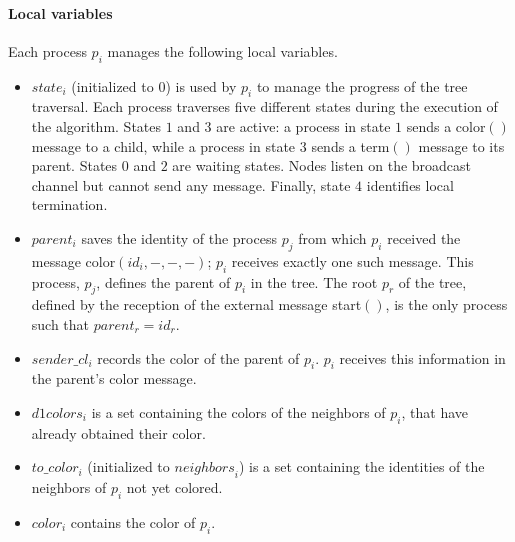 \documentclass[11pt,english]{article}
\newcommand{\neighbors}{\mathit{neighbors}}
\newcommand{\donecol}{\mathit{d1colors}}
\newcommand{\df}[1]{}\newcommand{\ccolor}{{\sc color}\xspace}
\newcommand{\term}{{\sc term}\xspace}
\begin{document}
\paragraph{Local variables}
Each process $p_i$ manages the following local variables. 
\begin{itemize}
\vspace{-0.1cm}
\item $state_i$ (initialized to $0$) is used by $p_i$ to manage the
  progress of the tree traversal.  Each process traverses five
  different states during the execution of the algorithm. States $1$
  and $3$ are active: a process in state $1$ sends a \ccolor$()$ message to
  a child, while a process in state $3$ sends a \term$()$  message to its
  parent.  States $0$ and $2$ are waiting states. Nodes listen on
  the broadcast channel but cannot send any message. Finally, state
  $4$ identifies local termination. 
\vspace{-0.2cm}
\item $parent_i$ saves the identity of the process $p_j$ from which
  $p_i$ received the message {\sc color}$(id_i,-,-,-)$; $p_i$ receives
  exactly one such  message.  This process, $p_j$, defines the parent
  of $p_i$ in the tree.  The root $p_r$ of the tree, defined by the
  reception of the external message {\sc start}$()$, is the only
  process such that $parent_r = id_r$.
\vspace{-0.2cm}
\item $sender\_cl_i$ records the color of the parent of $p_i$. $p_i$ 
  receives this information in the parent's \ccolor message.\df{This
    was collapsed into the previous one. I found it nicer to split
    them since they are two different variables albeit related.}
\vspace{-0.2cm}
\item $\donecol_i$ is a set containing the colors of the neighbors of $p_i$,
that have  already obtained their color. 
\vspace{-0.2cm}
\item $to\_color_i$ (initialized to $\neighbors_i$) is a set
  containing the identities of the neighbors of $p_i$ not yet
  colored. 
\vspace{-0.2cm}
\item  $color_i$ contains the color of $p_i$. \df{Same as above. This
    was collapsed into the previous but I preferred to split them.}
\end{itemize}
\end{document}
